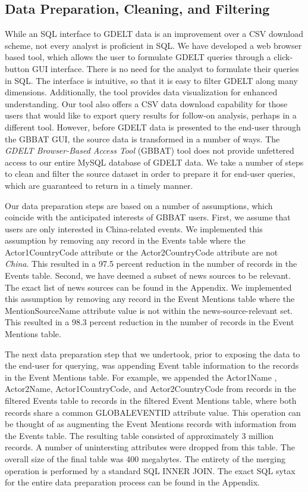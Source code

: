 \documentclass[preprint,authoryear,12pt]{elsarticle/elsarticle}
\begin{document}
\subsection{Data Preparation, Cleaning, and Filtering}
While an SQL interface to GDELT data is an improvement over a CSV download scheme, not every analyst is proficient in SQL. We have developed a web browser based tool, which allows the user to formulate GDELT queries through a click-button GUI interface. There is no need for the analyst to formulate their queries in SQL. The interface is intuitive, so that it is easy to filter GDELT along many dimensions. Additionally, the tool provides data visualization for enhanced understanding. Our tool also offers a CSV data download capability for those users that would like to export query results for follow-on analysis, perhaps in a different tool. However, before GDELT data is presented to the end-user through the GBBAT GUI, the source data is transformed in a number of ways. The \emph{GDELT Browser-Based Access Tool} (GBBAT) tool does not provide unfettered access to our entire MySQL database of GDELT data. We take a number of steps to clean and filter the source dataset in order to prepare it for end-user queries, which are guaranteed to return in a timely manner. 

Our data preparation steps are based on a number of assumptions, which coincide with the anticipated interests of GBBAT users. First, we assume that users are only interested in China-related events. We implemented this assumption by removing any record in the Events table where the Actor1CountryCode attribute or the Actor2CountryCode attribute are not \emph{China}. This resulted in a 97.5 percent reduction in the number of records in the Events table. Second, we have deemed a subset of news sources to be relevant. The exact list of news sources can be found in the Appendix. We implemented this assumption by removing any record in the Event Mentions table where the MentionSourceName attribute value is not within the news-source-relevant set. This resulted in a 98.3 percent reduction in the number of records in the Event Mentions table. 

The next data preparation step that we undertook, prior to exposing the data to the end-user for querying, was appending Event table information to the records in the Event Mentions table. For example, we appended the Actor1Name , Actor2Name, Actor1CountryCode, and Actor2CountryCode from records in the filtered Events table to records in the filtered Event Mentions table, where both records share a common GLOBALEVENTID attribute value. This operation can be thought of as augmenting the Event Mentions records with information from the Events table. The resulting table consisted of approximately 3 million records. A number of unintersting attributes were dropped from this table. The overall size of the final table was 400 megabytes. The entirety of the merging operation is performed by a standard SQL INNER JOIN. The exact SQL sytax for the entire data preparation process can be found in the Appendix. 
\end{document}
